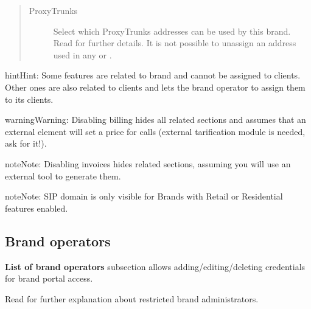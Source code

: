 \documentclass[letterpaper,10pt,english]{sphinxmanual}
\begin{document}
\begin{quote}
\begin{description}
\item[{ProxyTrunks}] \leavevmode
Select which ProxyTrunks addresses can be used by this brand. Read {\hyperref[administration_portal/platform/infrastructure/proxy_trunks:proxy\string-trunks]{}}
for further details. It is not possible to unassign an address used in any {\hyperref[administration_portal/brand/providers/carriers:carriers]{}} or
{\hyperref[administration_portal/brand/providers/ddi_providers:ddi\string-providers]{}}.

\end{description}
\end{quote}

\begin{notice}{hint}{Hint:}
Some features are related to brand and cannot be assigned to clients.
Other ones are also related to clients and lets the brand operator to
assign them to its clients.
\end{notice}

\begin{notice}{warning}{Warning:}
Disabling billing hides all related sections and assumes that an
external element will set a price for calls (external tarification
module is needed, ask for it!).
\end{notice}

\begin{notice}{note}{Note:}
Disabling invoices hides related sections, assuming you will use an
external tool to generate them.
\end{notice}

\begin{notice}{note}{Note:}
SIP domain is only visible for Brands with Retail or Residential features
enabled.
\end{notice}


\subsection{Brand operators}
\label{administration_portal/platform/brands:id2}\label{administration_portal/platform/brands:brand-operators}
\textbf{List of brand operators} subsection allows adding/editing/deleting credentials for brand portal access.

Read {\hyperref[api_rest/acls:acls]{}} for further explanation about restricted brand administrators.
\end{document}
